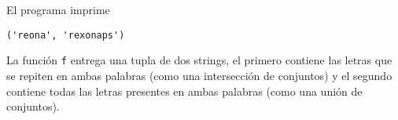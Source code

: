 El programa imprime
\begin{lstlisting}[style=consola]
('reona', 'rexonaps')
\end{lstlisting}

La función \texttt{f} entrega una tupla de dos strings, el primero contiene las letras que se repiten en ambas palabras (como una intersección de conjuntos) y el segundo contiene todas las letras presentes en ambas palabras (como una unión de conjuntos).
